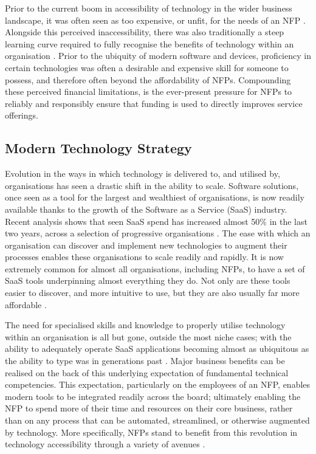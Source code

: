 Prior to the current boom in accessibility of technology in the wider business landscape, it was often seen as too expensive, or unfit, for the needs of an NFP \cite{infoxchange_2019} \cite{corder2001acquiring} \cite{le2008view}. Alongside this perceived inaccessibility, there was also traditionally a steep learning curve required to fully recognise the benefits of technology within an organisation \cite{mcwilliams1996time} \cite{lai2017literature}. Prior to the ubiquity of modern software and devices, proficiency in certain technologies was often a desirable and expensive skill for someone to possess, and therefore often beyond the affordability of NFPs. Compounding these perceived financial limitations, is the ever-present pressure for NFPs to reliably and responsibly ensure that funding is used to directly improves service offerings.

\subsection{Modern Technology Strategy}

Evolution in the ways in which technology is delivered to, and utilised by, organisations has seen a drastic shift in the ability to scale. Software solutions, once seen as a tool for the largest and wealthiest of organisations, is now readily available thanks to the growth of the Software as a Service (SaaS) industry. Recent analysis shows that seen SaaS spend has increased almost 50\% in the last two years, across a selection of progressive organisations \cite{blissfully2020}. The ease with which an organisation can discover and implement new technologies to augment their processes enables these organisations to scale readily and rapidly. It is now extremely common for almost all organisations, including NFPs, to have a set of SaaS tools underpinning almost everything they do. Not only are these tools easier to discover, and more intuitive to use, but they are also usually far more affordable \cite{ma2008pricing}.

The need for specialised skills and knowledge to properly utilise technology within an organisation is all but gone, outside the most niche cases; with the ability to adequately operate SaaS applications becoming almost as ubiquitous as the ability to type was in generations past \cite{garrido2010understanding} \cite{fischer2005computational} \cite{jackson2010international}. Major business benefits can be realised on the back of this underlying expectation of fundamental technical competencies. This expectation, particularly on the employees of an NFP, enables modern tools to be integrated readily across the board; ultimately enabling the NFP to spend more of their time and resources on their core business, rather than on any process that can be automated, streamlined, or otherwise augmented by technology. More specifically, NFPs stand to benefit from this revolution in technology accessibility through a variety of avenues \cite{kobelsky2014impact}.

